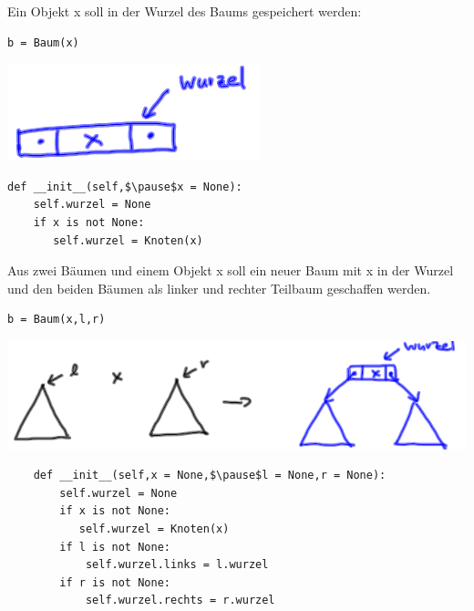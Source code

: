 \documentclass{beamer}
\begin{document}
\begin{frame}[fragile]
Ein Objekt x soll in der Wurzel des Baums gespeichert werden:

\begin{lstlisting}
b = Baum(x)
\end{lstlisting} 

\begin{minipage}[b]{5cm}
\includegraphics[scale=0.7]{bild6.png} 
\end{minipage}  
\begin{minipage}[b]{5cm}
\begin{lstlisting}
def __init__(self,$\pause$x = None): 
    self.wurzel = None
    if x is not None:
       self.wurzel = Knoten(x)
\end{lstlisting} 
\end{minipage} 

\end{frame}


\begin{frame}[fragile]

Aus zwei Bäumen und einem Objekt x soll ein neuer Baum mit x in der Wurzel und den beiden Bäumen als linker und rechter Teilbaum geschaffen werden.
\begin{lstlisting}
b = Baum(x,l,r)
\end{lstlisting} 
\includegraphics[scale=0.7]{bild7.png}  
\begin{lstlisting}
    def __init__(self,x = None,$\pause$l = None,r = None):
        self.wurzel = None
        if x is not None:
           self.wurzel = Knoten(x)
        if l is not None:
            self.wurzel.links = l.wurzel
        if r is not None:
            self.wurzel.rechts = r.wurzel
\end{lstlisting} 

\end{frame}
\end{document}
